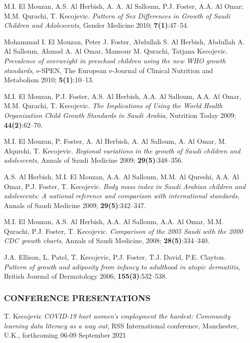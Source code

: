 \documentclass[
]{article}
\begin{document}
M.I. El Mouzan, A.S. Al Herbish, A. A. Al Salloum, P.J. Foster, A.A. Al
Omar; M.M. Qurachi, T. Kecojevic. \emph{Pattern of Sex Differences in
Growth of Saudi Children and Adolescents}, Gender Medicine 2010;
\textbf{7(1)}:47--54.

Mohammad I. El Mouzan, Peter J. Foster, Abdullah S. Al Herbish, Abdullah
A. Al Salloum, Ahmad A. Al Omar, Mansour M. Qurachi, Tatjana Kecojevic.
\emph{Prevalence of overweight in preschool children using the new WHO
growth standards}, e-SPEN, The European e-Journal of Clinical Nutrition
and Metabolism 2010; \textbf{5(1)}:10--13.

M.I. El Mouzan, P.J. Foster, A.S. Al Herbish, A.A. Al Salloum, A.A. Al
Omar, M.M. Qurachi, T. Kecojevic. \emph{The Implications of Using the
World Health Organization Child Growth Standards in Saudi Arabia},
Nutrition Today 2009; \textbf{44(2)}:62--70.

M.I. El Mouzan, P. Foster, A. Al Herbish, A. Al Salloum, A. Al Omar, M.
Alqurshi, T. Kecojevic. \emph{Regional variations in the growth of Saudi
children and adolescents}, Annals of Saudi Medicine 2009;
\textbf{29(5)}:348--356.

A.S. Al Herbish, M.I. El Mouzan, A.A. Al Salloum, M.M. Al Qureshi, A.A.
Al Omar, P.J. Foster, T. Kecojevic. \emph{Body mass index in Saudi
Arabian children and adolescents: A national reference and comparison
with international standards}, Annals of Saudi Medicine 2009;
\textbf{29(5)}:342--347.

M.I. El Mouzan, A.S. Al Herbish, A.A. Al Salloum, A.A. Al Omar, M.M.
Qurachi, P.J. Foster, T. Kecojevic. \emph{Comparison of the 2005 Saudi
with the 2000 CDC growth charts}, Annals of Saudi Medicine, 2008;
\textbf{28(5)}:334--340.

J.A. Ellison, L. Patel, T. Kecojevic, P.J. Foster, T.J. David, P.E.
Clayton. \emph{Pattern of growth and adiposity from infancy to adulthood
in atopic dermatitis}, British Journal of Dermatology 2006;
\textbf{155(3)}:532--538.

\hypertarget{conference-presentations}{%
\subsubsection{CONFERENCE
PRESENTATIONS}\label{conference-presentations}}

T. Kecojevic \emph{COVID-19 hurt women's employment the hardest:
Community learning data literacy as a way out}, RSS International
conference, Manchester, U.K., forthcoming 06-09 September 2021
\end{document}
